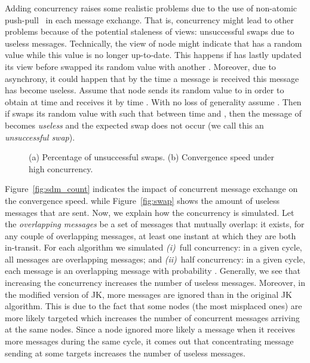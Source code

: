 \documentclass[times,10pt,twocolumn]{article}
\begin{document}
Adding concurrency raises some realistic problems due to
the use of non-atomic push-pull~\cite{JGKS04} in each message exchange.
That is, concurrency might lead to other problems because of
the potential staleness of views: unsuccessful swaps due to useless messages.  
Technically, the view of node  might 
indicate that  has a random value  while this value is no longer 
up-to-date.  This happens if  has lastly updated its view before  swapped
its random value with another .
Moreover, due to asynchrony, it could happen that by the time a message is received
this message has become useless.
Assume that node  sends its random value  to 
in order to obtain  at time  and  receives it by time . 
With no loss of generality assume .  Then if  swaps its random value with
 such that  between time  and , then the message of  
becomes \emph{useless} and the expected swap does not occur (we call this an \emph{unsuccessful swap}).



\begin{figure*}
  \begin{center}
    \hspace{1cm}
        \caption{
       (a) Percentage of unsuccessful swaps.
       (b) Convergence speed under high concurrency.}
  \end{center}
\end{figure*}


Figure~\ref{fig:sdm_count} indicates the impact of concurrent message exchange
on the convergence speed.
while
Figure~\ref{fig:swap} shows the amount of useless messages that are sent.
Now, we explain how the concurrency is simulated.
Let the \emph{overlapping messages} be a set of messages that mutually overlap: 
it exists, for any couple of overlapping messages, at least one instant at 
which they are both in-transit.  
For each algorithm we simulated \textit{(i)}~full concurrency: in a given 
cycle, all messages are overlapping messages; and \textit{(ii)}~half 
concurrency: in a given cycle, each message is an overlapping message with 
probability .
Generally, we see that increasing the concurrency increases the number of
useless messages. Moreover, in the modified version of JK, more messages are 
ignored than in the original JK algorithm.  This
is due to the fact that some nodes (the most misplaced ones) are more likely 
targeted which increases the number of concurrent messages arriving at the 
same nodes.  Since a node  ignored more likely a message when it receives
more messages during the same cycle, it comes out that concentrating
message sending at some targets increases the number of useless messages.
\end{document}
